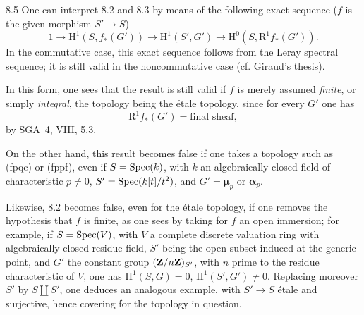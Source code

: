 \begin{remarks}{8.5}\label{XXIV.8.5}
One can interpret 8.2 and 8.3 by means of the following exact sequence ($f$ is the given morphism $S'\to S$)
\[
1\to\mathrm H^1(S,f_*(G'))\to\mathrm H^1(S',G')\to\mathrm H^0(S,\mathrm R^1f_*(G')).
\]
In the commutative case, this exact sequence follows from the Leray spectral sequence; it is still valid in the noncommutative case (cf. Giraud's thesis).

In this form, one sees that the result is still valid if $f$ is merely assumed \emph{finite}, or simply \emph{integral}, the topology being the étale topology, since for every $G'$ one has
\[
\mathrm R^1f_*(G')=\text{final sheaf},
\]
by SGA~4, VIII, 5.3.

On the other hand, this result becomes false if one takes a topology such as (fpqc) or (fppf), even if $S=\operatorname{Spec}(k)$, with $k$ an algebraically closed field of characteristic $p\ne0$, $S'=\operatorname{Spec}(k[t]/t^2)$, and $G'=\boldsymbol\mu_p$ or $\boldsymbol\alpha_p$.

Likewise, 8.2 becomes false, even for the étale topology, if one removes the hypothesis that $f$ is finite, as one sees by taking for $f$ an open immersion; for example, if $S=\operatorname{Spec}(V)$, with $V$ a complete discrete valuation ring with algebraically closed residue field, $S'$ being the open subset induced at the generic point, and $G'$ the constant group $(\mathbf{Z}/n\mathbf{Z})_{S'}$, with $n$ prime to the residue characteristic of $V$, one has $\mathrm H^1(S,G)=0$, $\mathrm H^1(S',G')\ne0$. Replacing moreover $S'$ by $S\amalg S'$, one deduces an analogous example, with $S'\to S$ étale and surjective, hence covering for the topology in question.
\end{remarks}

